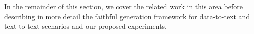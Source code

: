 In the remainder of this section, we cover the related work in this area
before describing in more detail the faithful generation framework for 
data-to-text and text-to-text scenarios and our proposed experiments.


